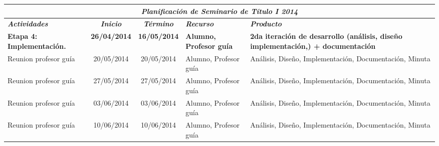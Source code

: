 \documentclass[12pt,letterpaper]{article}
\begin{document}
\begin{table}[htf]
\begin{tabular}{| p{4cm} | c | c | p{3cm}  | p{2.5cm} |}
\hline

\multicolumn{5}{|c|}{\textbf{\textit{Planificaci\'on de Seminario de T\'itulo I 2014}}} \\ \hline \hline
\textit{\textbf{Actividades}} & 
\textit{\textbf{Inicio}} & 
\textit{\textbf{T\'ermino}} & 
\centering \textit{\textbf{Recurso}} & 
\textit{\textbf{Producto}} \\ \hline \hline
\textbf{Etapa 4: Implementaci\'on.} & 
\textbf{26/04/2014} & 
\textbf{16/05/2014} & 
\textbf{Alumno, Profesor gu\'ia} & 
\textbf{2da  iteraci\'on de desarrollo (an\'alisis, dise\~no implementaci\'on,) + documentaci\'on} \\ \hline


Reunion profesor gu\'ia & 
20/05/2014 & 
20/05/2014 &  
Alumno, Profesor gu\'ia & 
An\'alisis, Dise\~no, Implementaci\'on, Documentaci\'on, Minuta\\ \hline

Reunion profesor gu\'ia & 
27/05/2014 & 
27/05/2014 &  
Alumno, Profesor gu\'ia & 
An\'alisis, Dise\~no, Implementaci\'on, Documentaci\'on, Minuta\\ \hline

Reunion profesor gu\'ia & 
03/06/2014 & 
03/06/2014 &  
Alumno, Profesor gu\'ia & 
An\'alisis, Dise\~no, Implementaci\'on, Documentaci\'on, Minuta\\ \hline

Reunion profesor gu\'ia & 
10/06/2014 & 
10/06/2014 &  
Alumno, Profesor gu\'ia & 
An\'alisis, Dise\~no, Implementaci\'on, Documentaci\'on, Minuta\\ \hline

\hline
\end{tabular}

\end{table}



\newpage
\clearpage
\end{document}

